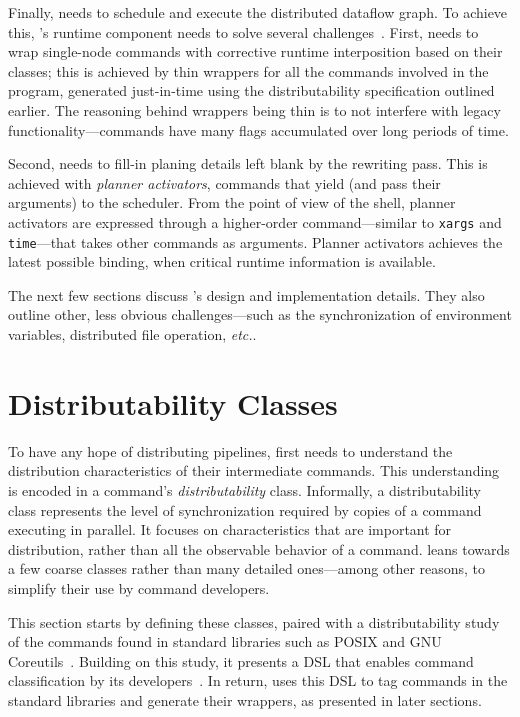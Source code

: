 \documentclass[sigplan,10pt,review,anonymous]{acmart}
\newcommand{\etc}{{\em etc.}\xspace}
\newcommand{\ttt}[1]{\texttt{\small #1}}
\newcommand{\nv}[1]{[{\color{cyan}#1 --- Nikos}]}
\newcommand{\kk}[1]{[{\color{magenta}#1 --- kk}]}
\begin{document}
Finally, \sys needs to schedule and execute the distributed dataflow graph.
To achieve this, \sys's runtime component needs to solve several challenges~.
First, \sys needs to wrap single-node commands with corrective runtime interposition based on their classes;
  this is achieved by thin wrappers for all the commands involved in the program, generated just-in-time using the distributability specification outlined earlier.
The reasoning behind wrappers being thin is to not interfere with legacy functionality---commands have many flags accumulated over long periods of time.

Second, \sys needs to fill-in planing details left blank by the rewriting pass.
This is achieved with \emph{planner activators}, commands that yield (and pass their arguments) to the scheduler.
From the point of view of the shell, planner activators are expressed through a higher-order command---similar to \ttt{xargs} and \ttt{time}---that takes other commands as arguments.
Planner activators achieves the latest possible binding, when critical runtime information is available.

The next few sections discuss \sys's design and implementation details.
They also outline other, less obvious challenges---such as the synchronization of environment variables, distributed file operation, \etc.


\section{Distributability Classes}
\label{distributability}

To have any hope of distributing \unix pipelines, \sys first needs to understand the distribution characteristics of their intermediate commands.
This understanding is encoded in a command's \emph{distributability} class.
Informally, a distributability class represents the level of synchronization required by copies of a command executing in parallel.
It focuses on characteristics that are important for distribution, rather than all the observable behavior of a command.
\sys leans towards a few coarse classes rather than many detailed ones---among other reasons, to simplify their use by command developers.

This section starts by defining these classes, paired with a distributability study of the commands found in standard libraries such as {\sc POSIX} and GNU Coreutils~.
Building on this study, it presents a DSL that enables command classification by its developers~.
In return, \sys uses this DSL to tag commands in the standard libraries and generate their wrappers, as presented in later sections.
\end{document}
